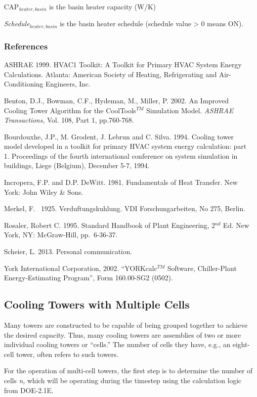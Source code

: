 CAP\emph{\(_{heater,basin}\)} is the basin heater capacity (W/K)

\emph{Schedule\(_{heater,basin}\)} is the basin heater schedule (schedule value \textgreater{} 0 means ON).

\subsubsection{References}\label{references-1-005}

ASHRAE 1999. HVAC1 Toolkit: A Toolkit for Primary HVAC System Energy Calculations. Atlanta: American Society of Heating, Refrigerating and Air-Conditioning Engineers, Inc.

Benton, D.J., Bowman, C.F., Hydeman, M., Miller, P. 2002. An Improved Cooling Tower Algorithm for the CoolTools\(^{TM}\) Simulation Model. \emph{ASHRAE Transactions,} Vol. 108, Part 1, pp.760-768.

Bourdouxhe, J.P., M. Grodent, J. Lebrun and C. Silva. 1994. Cooling tower model developed in a toolkit for primary HVAC system energy calculation: part 1. Proceedings of the fourth international conference on system simulation in buildings, Liege (Belgium), December 5-7, 1994.

Incropera, F.P. and D.P. DeWitt. 1981. Fundamentals of Heat Transfer. New York: John Wiley \& Sons.

Merkel, F.~ 1925. Verduftungskuhlung. VDI Forschungarbeiten, No 275, Berlin.

Rosaler, Robert C. 1995. Standard Handbook of Plant Engineering, 2\(^{nd}\) Ed. New York, NY: McGraw-Hill, pp.~6-36-37.

Scheier, L. 2013. Personal communication.

York International Corporation, 2002. ``YORKcalc\(^{TM}\) Software, Chiller-Plant Energy-Estimating Program'', Form 160.00-SG2 (0502).

\subsection{Cooling Towers with Multiple Cells}\label{cooling-towers-with-multiple-cells}

Many towers are constructed to be capable of being grouped together to achieve the desired capacity. Thus, many cooling towers are assemblies of two or more individual cooling towers or ``cells.'' The number of cells they have, e.g., an eight-cell tower, often refers to such towers.

For the operation of multi-cell towers, the first step is to determine the number of cells \emph{n,} which will be operating during the timestep using the calculation logic from DOE-2.1E.


